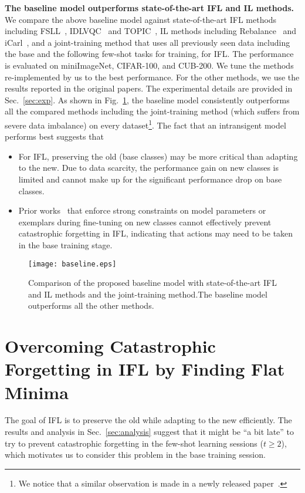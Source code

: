 \documentclass{article}
\begin{document}
\textbf{The baseline model outperforms state-of-the-art IFL and IL methods.} We compare the above baseline model against state-of-the-art IFL methods including FSLL~\citep{FSLL}, IDLVQC~\citep{IDLVQC} and TOPIC~\citep{TOPIC}, IL methods including Rebalance~\citep{NCM} and iCarl~\citep{icarl}, and a joint-training method that uses all previously seen data including the base and the following few-shot tasks for training, for IFL. The performance is evaluated on miniImageNet, CIFAR-100, and CUB-200. We tune the methods re-implemented by us to the best performance. For the other methods, we use the results reported in the original papers. The experimental details are provided in Sec.~\ref{sec:exp}.
As shown in Fig.~\ref{fig_table1}, the baseline model consistently outperforms all the compared methods including the joint-training method (which suffers from severe data imbalance) on every dataset\footnote{We notice that a similar observation is made in a newly released paper~\citep{zhang2021few}.}. The fact that an intransigent model performs best suggests that 
\begin{itemize}
    \item For IFL, preserving the old (base classes) may be more critical than adapting to the new. Due to data scarcity, the performance gain on new classes is limited and cannot make up for the significant performance drop on base classes. 
    \item Prior works~\citep{TOPIC,IDLVQC,FSLL,NCM,icarl} that enforce strong constraints on model parameters or exemplars during fine-tuning on new classes cannot effectively prevent catastrophic forgetting in IFL, indicating that actions may need to be taken in the base training stage.
\end{itemize}

\begin{figure}
    \centering
  \texttt{[image: baseline.eps]}
  \caption{Comparison of the proposed baseline model with state-of-the-art IFL and IL methods and the joint-training method.The baseline model outperforms all the other methods.}
  \label{fig_table1}
\end{figure}

\section{Overcoming Catastrophic Forgetting in IFL by Finding Flat Minima}
The goal of IFL is to preserve the old while adapting to the new efficiently. The results and analysis in Sec.~\ref{sec:analysis} suggest that it might be ``a bit late'' to try to prevent catastrophic forgetting in the few-shot learning sessions ($t\geq 2$), which motivates us to consider this problem in the base training session. 
\end{document}
